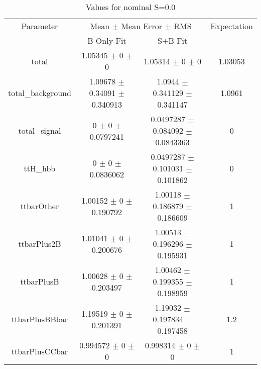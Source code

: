 \begin{table}
\centering
\caption{Values for nominal S=0.0}
\begin{tabular}{cccc}
\toprule
Parameter & \multicolumn{2}{c}{Mean $\pm$ Mean Error $\pm$ RMS} & Expectation\\
 & B-Only Fit & S+B Fit & \\
\midrule
total & \num{1.05345} $\pm$ \num{0} $\pm$ \num{0} & \num{1.05314} $\pm$ \num{0} $\pm$ \num{0} & \num{1.03053}\\
total\_background & \num{1.09678} $\pm$ \num{0.34091} $\pm$ \num{0.340913} & \num{1.0944} $\pm$ \num{0.341129} $\pm$ \num{0.341147} & \num{1.0961}\\
total\_signal & \num{0} $\pm$ \num{0} $\pm$ \num{0.0797241} & \num{0.0497287} $\pm$ \num{0.084092} $\pm$ \num{0.0843363} & \num{0}\\
ttH\_hbb & \num{0} $\pm$ \num{0} $\pm$ \num{0.0836062} & \num{0.0497287} $\pm$ \num{0.101031} $\pm$ \num{0.101862} & \num{0}\\
ttbarOther & \num{1.00152} $\pm$ \num{0} $\pm$ \num{0.190792} & \num{1.00118} $\pm$ \num{0.186879} $\pm$ \num{0.186609} & \num{1}\\
ttbarPlus2B & \num{1.01041} $\pm$ \num{0} $\pm$ \num{0.200676} & \num{1.00513} $\pm$ \num{0.196296} $\pm$ \num{0.195931} & \num{1}\\
ttbarPlusB & \num{1.00628} $\pm$ \num{0} $\pm$ \num{0.203497} & \num{1.00462} $\pm$ \num{0.199355} $\pm$ \num{0.198959} & \num{1}\\
ttbarPlusBBbar & \num{1.19519} $\pm$ \num{0} $\pm$ \num{0.201391} & \num{1.19032} $\pm$ \num{0.197834} $\pm$ \num{0.197458} & \num{1.2}\\
ttbarPlusCCbar & \num{0.994572} $\pm$ \num{0} $\pm$ \num{0} & \num{0.998314} $\pm$ \num{0} $\pm$ \num{0} & \num{1}\\
\bottomrule
\end{tabular}
\end{table}